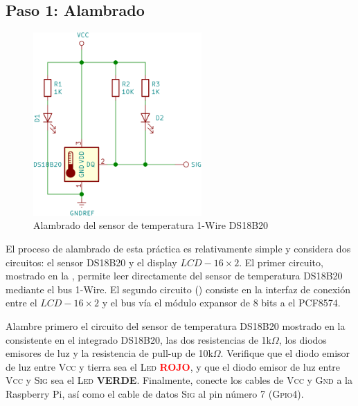 %
%



\subsection{Paso 1: Alambrado}%
\label{sec:step1}%
%
\begin{figure}
	\vspace{-8mm}
	\centering
	\includegraphics[width=0.3\columnwidth,height=7cm,keepaspectratio]{img/DS18B20.png}
	\caption{Alambrado del sensor de temperatura 1-Wire DS18B20}
	\label{fig:circuit-full} %
\end{figure}
%
El proceso de alambrado de esta práctica es relativamente simple y considera dos circuitos: el sensor DS18B20 y el display $LCD-16\times2$.
El primer circuito, mostrado en la , permite leer directamente del sensor de temperatura DS18B20 mediante el bus 1-Wire.
El segundo circuito () consiste en la interfaz de conexión entre el $LCD-16\times2$ y el bus \IIC vía el módulo expansor de 8 bits a \IIC el PCF8574.

Alambre primero el circuito del sensor de temperatura DS18B20 mostrado en la  consistente en el integrado DS18B20,
las dos resistencias de 1k$\Omega$,
los diodos emisores de luz
y la resistencia de pull-up de 10k$\Omega$.
Verifique que el diodo emisor de luz entre \textsc{Vcc} y tierra sea el \textsc{Led} \textcolor{red}{\textbf{ROJO}},
y que el diodo emisor de luz entre \textsc{Vcc} y \textsc{Sig} sea el \textsc{Led} \textcolor{OliveGreen}{\textbf{VERDE}}.
Finalmente, conecte los cables de \textsc{Vcc} y \textsc{Gnd} a la Raspberry Pi, así como el cable de datos \textsc{Sig} al pin número 7 (\textsc{Gpio4}).

